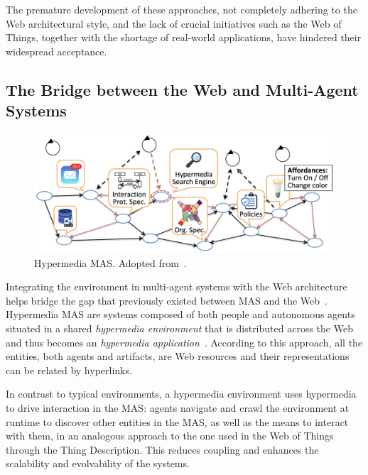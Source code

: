 The premature development of these approaches, not completely adhering to the Web architectural style, and the lack of crucial initiatives such as the Web of Things, together with the shortage of real-world applications, have hindered their widespread acceptance.

\subsection{The Bridge between the Web and Multi-Agent Systems}

\begin{figure}
    \centering
    \includegraphics[width=\linewidth]{images/hypermedia-mas.png}
    \caption{Hypermedia MAS. Adopted from~\cite{ciortea2019}.}
    \label{fig:hypermedia-mas}
\end{figure}

Integrating the environment in multi-agent systems with the Web architecture helps bridge the gap that previously existed between MAS and the Web~\cite{ciortea2019}.
Hypermedia MAS are systems composed of both people and autonomous agents situated in a shared \textit{hypermedia environment} that is distributed across the Web and thus becomes an \textit{hypermedia application}~\cite{ciortea2018}.
According to this approach, all the entities, both agents and artifacts, are Web resources and their representations can be related by hyperlinks.

In contrast to typical environments, a hypermedia environment uses hypermedia to drive interaction in the MAS: agents navigate and crawl the environment at runtime to discover other entities in the MAS, as well as the means to interact with them, in an analogous approach to the one used in the Web of Things through the Thing Description.
This reduces coupling and enhances the scalability and evolvability of the systems.

